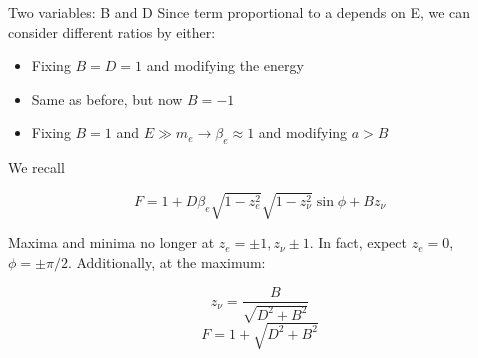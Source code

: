 \documentclass{beamer}
\begin{document}
\begin{frame}{Two variables: B and D}
	Since term proportional to a depends on E, we can consider different ratios by either:
	\begin{itemize}
		\item Fixing $B = D = 1$ and modifying the energy
		\item Same as before, but now $B = -1$
		\item Fixing $B = 1$ and $E \gg m_e \rightarrow \beta_e \approx 1$ and modifying $a > B$
	\end{itemize}
	
	We recall
	
	$$F = 1 + D\beta_e\sqrt{1-z^2_e}\sqrt{1-z^2_\nu}\sin \phi + Bz_\nu$$
	
	Maxima and minima no longer at $z_e=\pm1,z_\nu \pm1$. In fact, expect $z_e = 0$, $\phi = \pm\pi/2$. Additionally, at the maximum:
	
	$$z_\nu = \frac B{\sqrt{D^2+B^2}}$$
	$$F = 1 + \sqrt{D^2+B^2}$$    

\end{frame}
\end{document}

